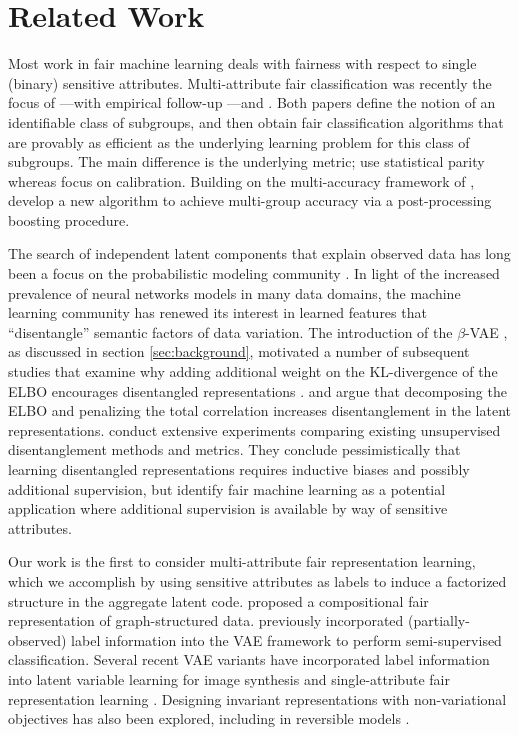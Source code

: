 \section{Related Work}
Most work in fair machine learning deals with fairness with respect to single (binary) sensitive attributes. 
Multi-attribute fair classification was recently the focus of \citet{kearns2017preventing}---with empirical follow-up \citep{kearns2018empirical}---and \citet{johnson2018multicalibration}.
Both papers define the notion of an identifiable class of subgroups, and then obtain fair classification algorithms that are provably as efficient as the underlying learning problem for this class of subgroups.
The main difference is the underlying metric; \citet{kearns2017preventing} use statistical parity whereas \citet{johnson2018multicalibration} focus on calibration. 
Building on the multi-accuracy framework of \citet{johnson2018multicalibration}, \citet{kim2018multiaccuracy} develop a new algorithm to achieve multi-group accuracy via a post-processing boosting procedure. 

The search of independent latent components that explain observed data has long been a focus on the probabilistic modeling community \cite{comon1994independent,hyvarinen2000independent,bach2002kernel}.
In light of the increased prevalence of neural networks models in many data domains, the machine learning community has renewed its interest in learned features that ``disentangle'' semantic factors of data variation.
The introduction of the $\beta$-VAE \citep{higgins2016beta}, as discussed in section \ref{sec:background}, motivated a number of subsequent studies  that examine why adding additional weight on the KL-divergence of the ELBO encourages disentangled representations \citep{alemi2018fixing, burgess2018understanding}.
\citet{chen2018isolating,kim2018disentangling} and \citet{esmaeili2018structured} argue that decomposing the ELBO and penalizing the total correlation increases disentanglement in the latent representations. 
\citet{locatello2018challenging} conduct extensive experiments comparing existing unsupervised disentanglement methods and metrics. 
They conclude pessimistically that learning disentangled representations requires inductive biases and possibly additional supervision, but identify fair machine learning as a potential application where additional supervision is available by way of sensitive attributes.

Our work is the first to consider multi-attribute fair representation learning, which we accomplish by using sensitive attributes as labels to induce a factorized structure in the aggregate latent code.
\citet{bose2018compositional} proposed a compositional fair representation of graph-structured data.
\citet{kingma2014semi} previously incorporated (partially-observed) label information into the VAE framework to perform semi-supervised classification.
Several recent VAE variants have incorporated label information into latent variable learning for image synthesis \cite{klys2018learning} and single-attribute fair representation learning \cite{song2018learning,botros2018hierarchical,moyer2018invariant}.
Designing invariant representations with non-variational objectives has also been explored, including in reversible models \cite{ardizzone2018analyzing,jacobsen2018excessive}.

